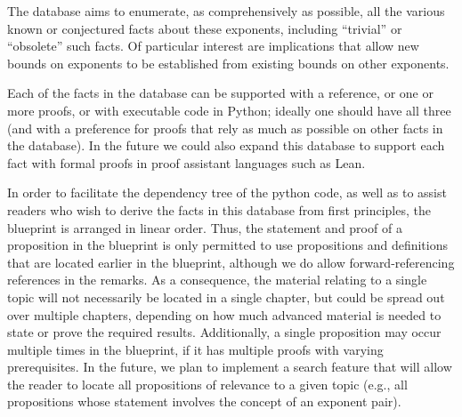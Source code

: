 The database aims to enumerate, as comprehensively as possible, all the various known or conjectured facts about these exponents, including ``trivial'' or ``obsolete'' such facts.  Of particular interest are implications that allow new bounds on exponents to be established from existing bounds on other exponents.

Each of the facts in the database can be supported with a reference, or one or more proofs, or with executable code in Python; ideally one should have all three (and with a preference for proofs that rely as much as possible on other facts in the database).  In the future we could also expand this database to support each fact with formal proofs in proof assistant languages such as Lean.

In order to facilitate the dependency tree of the python code, as well as to assist readers who wish to derive the facts in this database from first principles, the blueprint is arranged in linear order.  Thus, the statement and proof of a proposition in the blueprint is only permitted to use propositions and definitions that are located earlier in the blueprint, although we do allow forward-referencing references in the remarks.  As a consequence, the material relating to a single topic will not necessarily be located in a single chapter, but could be spread out over multiple chapters, depending on how much advanced material is needed to state or prove the required results.  Additionally, a single proposition may occur multiple times in the blueprint, if it has multiple proofs with varying prerequisites.  In the future, we plan to implement a search feature that will allow the reader to locate all propositions of relevance to a given topic (e.g., all propositions whose statement involves the concept of an exponent pair).
